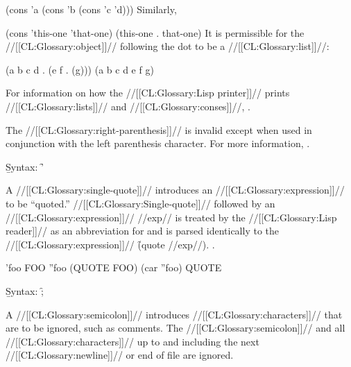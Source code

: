 \code
 (cons 'a (cons 'b (cons 'c 'd))) \endcode Similarly,

\code
 (cons 'this-one 'that-one) \EV (this-one . that-one) \endcode It is permissible for the //[[CL:Glossary:object]]//  following the dot to be a //[[CL:Glossary:list]]//:

\code
 (a b c d . (e f . (g))) \EQ (a b c d e f g) \endcode

For information on how the //[[CL:Glossary:Lisp printer]]// prints //[[CL:Glossary:lists]]// and //[[CL:Glossary:conses]]//, \seesection\PrintingListsAndConses.

\endsubsection%

 \idxcode{)}

The //[[CL:Glossary:right-parenthesis]]// is invalid  except when used in conjunction with the left parenthesis character. For more information, \seesection\ReaderAlgorithm.

\endsubsection%

  

\b{Syntax:}  \f{'}

A //[[CL:Glossary:single-quote]]// introduces an //[[CL:Glossary:expression]]// to be ``quoted.'' //[[CL:Glossary:Single-quote]]// followed by an //[[CL:Glossary:expression]]// //exp//  is treated by the //[[CL:Glossary:Lisp reader]]// as an abbreviation for and is parsed identically to the //[[CL:Glossary:expression]]// \f{(quote //exp//)}. .


\code
 'foo \EV FOO
 ''foo \EV (QUOTE FOO)
 (car ''foo) \EV QUOTE \endcode

\endsubsubsection%

\endsubsection%

 \idxcode{;}

\b{Syntax:} \f{;}

A //[[CL:Glossary:semicolon]]// introduces //[[CL:Glossary:characters]]// that are to be ignored, such as comments.  The //[[CL:Glossary:semicolon]]// and all //[[CL:Glossary:characters]]// up to and including the next //[[CL:Glossary:newline]]// or end of file are ignored.

